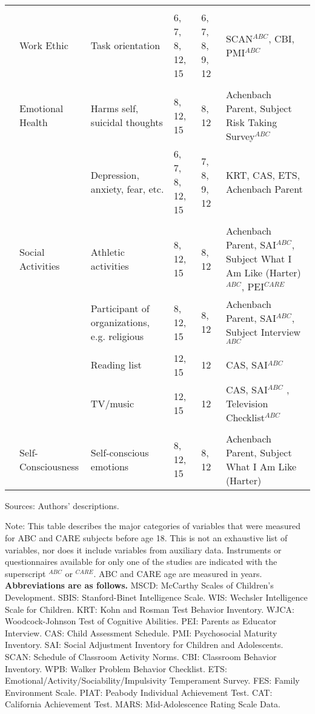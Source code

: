 \begin{sidewaystable}[H]
\begin{threeparttable}
\begin{tabular}{L{3.5cm} C{3.5cm} C{5cm} C{1.5cm} C{1.5cm} C{6cm}}
	&	\\
	&	Work Ethic	&	Task orientation	&	6, 7, 8, 12, 15	&	6, 7, 8, 9, 12 	&	SCAN$^{ABC}$, CBI, PMI$^{ABC}$		\\
	&	\\
	&	Emotional Health	&	Harms self, suicidal thoughts	&	8, 12, 15	&	8, 12	 	&	Achenbach Parent,  Subject Risk Taking Survey$^{ABC}$		\\
	&		&	Depression, anxiety, fear, etc.	&	6, 7, 8, 12, 15	&	7, 8, 9, 12	&	KRT, CAS, ETS,  Achenbach Parent	\\
	&	\\
	&	Social Activities	&	Athletic activities	&	8, 12, 15	&	8, 12		&	Achenbach Parent, SAI$^{ABC}$, Subject What I Am Like (Harter)$^{ABC}$, PEI$^{CARE}$	\\
	&		&	Participant of organizations, e.g. religious	&	8, 12, 15	&	8, 12	&	Achenbach Parent, SAI$^{ABC}$, Subject Interview$^{ABC}$	\\
	&		&	Reading list	&	12, 15	&	12	&	CAS, SAI$^{ABC}$	 \\
	&		&	TV/music	&	12, 15	&	12	&	CAS, SAI$^{ABC}$	, Television Checklist$^{ABC}$		\\
	&	\\
	&	Self-Consciousness	&	Self-conscious emotions	&	8, 12, 15	&	8, 12	&	Achenbach Parent, Subject What I Am Like (Harter)	\\ \midrule
	\end{tabular}
\begin{tablenotes}
\scriptsize
\item Sources: Authors' descriptions. \\
\item Note: This table describes the major categories of variables that were measured for ABC and CARE subjects before age 18. This is not an exhaustive list of variables, nor does it include variables from auxiliary data.  Instruments or questionnaires available for only one of the studies are indicated with the superscript $^{ABC}$ or $^{CARE}$. ABC and CARE age are measured in years. \textbf{Abbreviations are as follows.}  MSCD: McCarthy Scales of Children's Development. SBIS: Stanford-Binet Intelligence Scale. WIS: Wechsler Intelligence Scale for Children. KRT: Kohn and Rosman Test Behavior Inventory. WJCA: Woodcock-Johnson Test of Cognitive Abilities. PEI: Parents as Educator Interview. CAS: Child Assessment Schedule. PMI: Psychosocial Maturity Inventory. SAI: Social Adjustment Inventory for Children and Adolescents. SCAN: Schedule of Classroom Activity Norms. CBI: Classroom Behavior Inventory. WPB: Walker Problem Behavior Checklist. ETS: Emotional/Activity/Sociability/Impulsivity Temperament Survey. FES: Family Environment Scale. PIAT: Peabody Individual Achievement Test. CAT: California Achievement Test. MARS: Mid-Adolescence Rating Scale Data.
\end{tablenotes}
\end{threeparttable}
\end{sidewaystable}

